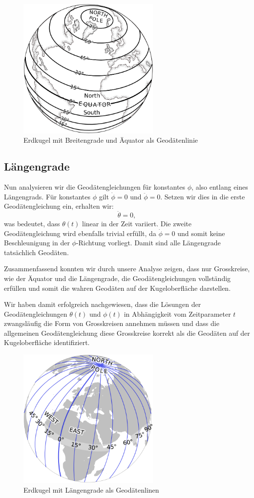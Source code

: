 \begin{figure}
	\centering
	\includegraphics[width=7cm]{papers/geodaeten/Abbildungen/Standardverfahren/StaKugelBreitengrade}
	\caption{Erdkugel mit Breitengrade und Äquator als Geodätenlinie}
	\label{geodaeten:figure:Standardverfahren:Breitengrade}
\end{figure}

\subsection{Längengrade}
Nun analysieren wir die Geodätengleichungen für konstantes $\phi$, also entlang eines Längengrads.
Für konstantes $\phi$ gilt $\dot{\phi} = 0$ und $\ddot{\phi} = 0$.
Setzen wir dies in die erste Geodätengleichung ein, erhalten wir:
\begin{equation}
	\ddot{\theta} = 0,
\end{equation}
was bedeutet, dass $\theta(t)$ linear in der Zeit variiert.
Die zweite Geodätengleichung wird ebenfalls trivial erfüllt, da $\dot{\phi} = 0$ und somit keine Beschleunigung in der $\phi$-Richtung vorliegt.
Damit sind alle Längengrade tatsächlich Geodäten.

Zusammenfassend konnten wir durch unsere Analyse zeigen, dass nur Grosskreise, wie der Äquator und die Längengrade, die Geodätengleichungen vollständig erfüllen und somit die wahren Geodäten auf der Kugeloberfläche darstellen.

Wir haben damit erfolgreich nachgewiesen, dass die Lösungen der Geodätengleichungen $\theta(t)$ und $\phi(t)$ in Abhängigkeit vom Zeitparameter $t$ zwangsläufig die Form von Grosskreisen annehmen müssen und dass die allgemeinen Geodätengleichung diese Grosskreise korrekt als die Geodäten auf der Kugeloberfläche identifiziert.

\begin{figure}
	\centering
	\includegraphics[width=7cm]{papers/geodaeten/Abbildungen/Standardverfahren/StaKugelLaengengrade}
	\caption{Erdkugel mit Längengrade als Geodätenlinen}
	\label{geodaeten:figure:Standardverfahren:Laengengrade}
\end{figure}


